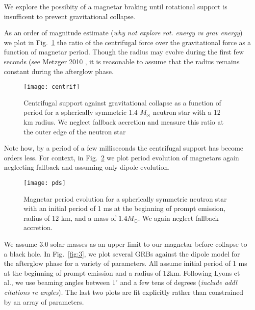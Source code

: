 \documentclass{article}
\begin{document}
We explore the possibity of a magnetar braking until rotational support is insufficent to prevent gravitational collapse.

As an order of magnitude estimate (\textit{why not explore rot. energy vs grav energy}) we plot in Fig.~\ref{fig:1} the ratio of the centrifugal force over the gravitational force as a function of magnetar period. Though the radius may evolve during the first few seconds (see Metzger 2010 \cite{Metzger:2010pp}, it is reasonable to assume that the radius remains constant during the afterglow phase.

\begin{figure}[h!]
\centering
\texttt{[image: centrif]}
\caption{Centrifugal support against gravitational collapse as a function of period for a spherically symmetric 1.4 $M_{\odot}$ neutron star with a 12 km radius. We neglect fallback accretion and measure this ratio at the outer edge of the neutron star}
\label{fig:1}
\end{figure}

Note how, by a period of a few milliseconds the centrifugal support has become orders less. For context, in Fig.~\ref{fig:2} we plot period evolution of magnetars again neglecting fallback and assuming only dipole evolution.

\begin{figure}[h!]
\centering
\texttt{[image: pds]}
\caption{Magnetar period evolution for a spherically symmetric neutron star with an initial period of 1 ms at the beginning of prompt emission, radius of 12 km, and a mass of $1.4 M_{\odot}$. We again neglect fallback accretion.}
\label{fig:2}
\end{figure}

We assume 3.0 solar masses \cite{Kaplan:2013wra} as an upper limit to our magnetar before collapse to a black hole. In Fig.~\ref{fig:3}, we plot several GRBs against the dipole model for the afterglow phase for a variety of parameters. All assume initial period of 1 ms at the beginning of prompt emission and a radius of 12km. Following Lyons et al., we use beaming angles between $1^{\circ}$ and a few tens of degrees \cite{Lyons:2009ka} (\textit{include addl citations re angles}).  The last two plots are fit explicitly rather than constrained by an array of parameters.
\end{document}
